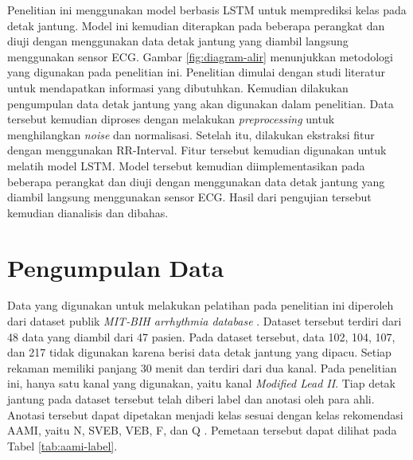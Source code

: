 



Penelitian ini menggunakan model berbasis LSTM untuk memprediksi kelas pada detak jantung. Model ini kemudian diterapkan pada beberapa perangkat dan diuji dengan menggunakan data detak jantung yang diambil langsung menggunakan sensor ECG. Gambar \ref{fig:diagram-alir} menunjukkan metodologi yang digunakan pada penelitian ini. 
Penelitian dimulai dengan studi literatur untuk mendapatkan informasi yang dibutuhkan. Kemudian dilakukan pengumpulan data detak jantung yang akan digunakan dalam penelitian. Data tersebut kemudian diproses dengan melakukan \textit{preprocessing} untuk menghilangkan \textit{noise} dan normalisasi. Setelah itu, dilakukan ekstraksi fitur dengan menggunakan RR-Interval. Fitur tersebut kemudian digunakan untuk melatih model LSTM. Model tersebut kemudian diimplementasikan pada beberapa perangkat dan diuji dengan menggunakan data detak jantung yang diambil langsung menggunakan sensor ECG. Hasil dari pengujian tersebut kemudian dianalisis dan dibahas.



\section{Pengumpulan Data}
\label{subsec: metodologi-pengumpulan-data}


Data yang digunakan untuk melakukan pelatihan pada penelitian ini diperoleh dari dataset publik \textit{MIT‐BIH arrhythmia database} \parencite{moodyImpactMITBIHArrhythmia2001}. Dataset tersebut terdiri dari 48 data yang diambil dari 47 pasien. Pada dataset tersebut, data 102, 104, 107, dan 217 tidak digunakan karena berisi data detak jantung yang dipacu. Setiap rekaman memiliki panjang 30 menit dan terdiri dari dua kanal. Pada penelitian ini, hanya satu kanal yang digunakan, yaitu kanal \textit{Modified Lead II}.
Tiap detak jantung pada dataset tersebut telah diberi label dan anotasi oleh para ahli. Anotasi tersebut dapat dipetakan menjadi kelas sesuai dengan kelas rekomendasi AAMI, yaitu N, SVEB, VEB, F, dan Q \parencite{associationfortheadvancementofmedicalinstrumentationTestingReportingPerformance1998}. Pemetaan tersebut dapat dilihat pada Tabel \ref{tab:aami-label}.

